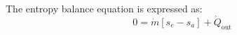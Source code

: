 The entropy balance equation is expressed as:  
\[
0 = \dot{m} \left[ s_e - s_a \right] + \dot{Q}_{\text{out}}
\]